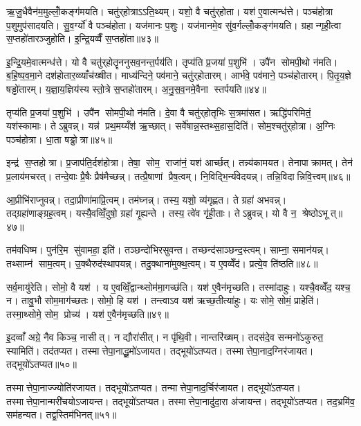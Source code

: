 ऋ॒जु॒धैवैन॑म॒मुल्लोँ॒कङ्ग॑मयति। चतु॑र्‌होत्राऽऽति॒थ्यम्। यशो॒ वै चतु॑र्‌होता। यश॑ ए॒वात्मन्ध॑त्ते। पञ्च॑होत्रा प॒शुमुप॑सादयति। सु॒व॒र्ग्यो॑ वै पञ्च॑होता। यज॑मानः प॒शुः। यज॑मानमे॒व सु॑व॒र्गल्लोँ॒कङ्ग॑मयति। ग्रहान्गृही॒त्वा स॒प्तहो॑तारञ्जुहोति। इ॒न्द्रि॒यव्वैँ स॒प्तहो॑ता॥४३॥

इ॒न्द्रि॒यमे॒वात्मन्ध॑त्ते। यो वै चतु॑र्‌होतॄननुसव॒नन्त॒र्पय॑ति। तृप्य॑ति प्र॒जया॑ प॒शुभि॑। उपै॑न सोमपी॒थो न॑मति। ब॒हि॒ष्प॒व॒मा॒ने दश॑होतार॒व्व्याँच॑ख्षीत। माध्य॑न्दिने॒ पव॑माने॒ चतु॑र्‌होतारम्। आर्भ॑वे॒ पव॑माने॒ पञ्च॑होतारम्। पि॒तृ॒य॒ज्ञे षड्ढो॑तारम्। य॒ज्ञा॒य॒ज्ञिय॑स्य स्तो॒त्रे स॒प्तहो॑तारम्। अ॒नु॒स॒व॒नमे॒वैना स्तर्पयति॥४४॥

तृप्य॑ति प्र॒जया॑ प॒शुभि॑। उपै॑न सोमपी॒थो न॑मति। दे॒वा वै चतु॑र्‌होतृभिः स॒त्रमा॑सत। ऋद्धि॑परिमितं॒ यश॑स्कामाः। तेऽब्रुवन्न्। यन्न॑ प्रथ॒मय्यँश॑ ऋ॒च्छात्। सर्वे॑षान्न॒स्तथ्स॒हास॒दिति॑। सोम॒श्चतु॑र्‌होत्रा। अ॒ग्निः पञ्च॑होत्रा। धा॒ता षड्ढोत्रा॥४५॥

इन्द्र॑ स॒प्तहोत्रा। प्र॒जाप॑ति॒र्दश॑होत्रा। तेषा॒ सोम॒ राजा॑नं॒ यश॑ आर्च्छत्। तन्न्य॑कामयत। तेनापाक्रामत्। तेन॑ प्र॒लाय॑मचरत्। तन्दे॒वाः प्रै॒षैः प्रैष॑मैच्छन्न्। तत्प्रै॒षाणां प्रैष॒त्वम्। नि॒विद्भि॒र्न्य॑वेदयन्न्। तन्नि॒विदान्निवि॒त्त्वम्॥४६॥

आ॒प्रीभि॑राप्नुवन्न्। तदा॒प्रीणा॑माप्रि॒त्वम्। तम॑घ्नन्न्। तस्य॒ यशो॒ व्य॑गृह्णत। ते ग्रहा॑ अभवन्न्। तद्ग्रहा॑णाङ्ग्रह॒त्वम्। यस्यै॒वव्विँ॒दुषो॒ ग्रहा॑ गृ॒ह्यन्ते। तस्य॒ त्वे॑व गृ॑ही॒ताः। तेऽब्रुवन्न्। यो वै न॒ श्रेष्ठोऽभूत्॥४७॥

तम॑वधिष्म। पुन॑रि॒म सु॑वामहा॒ इति॑। तञ्छन्दो॑भिरसुवन्त। तच्छन्द॑साञ्छन्द॒स्त्वम्। साम्ना॒ समान॑यन्न्। तथ्साम्न॑ साम॒त्वम्। उ॒क्थैरुद॑स्थापयन्न्। तदु॒क्थाना॑मुक्थ॒त्वम्। य ए॒वव्वेँद॑। प्रत्ये॒व ति॑ष्ठति॥४८॥

सर्व॒मायु॑रेति। सोमो॒ वै यश॑। य ए॒वव्विँ॒द्वान्थ्सोम॑मा॒गच्छ॑ति। यश॑ ए॒वैन॑मृच्छति। तस्मा॑दाहुः। यश्चै॒वव्वेँद॒ यश्च॒ न। तावु॒भौ सोम॒माग॑च्छतः। सोमो॒ हि यश॑। तन्त्वाऽव यश॑ ऋच्छ॒तीत्या॑हुः। यः सोमे॒ सोमं॒ प्राहेति॑। तस्मा॒थ्सोमे॒ सोम॒ प्रोच्य॑। यश॑ ए॒वैन॑मृच्छति॥४९॥

इ॒दव्वाँ अग्रे॒ नैव किञ्च॒ नासीत्। न द्यौरा॑सीत्। न पृ॑थि॒वी। नान्तरि॑ख्षम्। तदस॑दे॒व सन्मनो॑ऽकुरुत॒ स्यामिति॑। तद॑तप्यत। तस्मात्तेपा॒नाद्धू॒मो॑ऽजायत। तद्भूयो॑ऽतप्यत। तस्मात्तेपा॒नाद॒ग्निर॑जायत। तद्भूयो॑ऽतप्यत॥५०॥

तस्मात्तेपा॒नाज्ज्योति॑रजायत। तद्भूयो॑ऽतप्यत। तन्मात्तेपा॒नाद॒र्चिर॑जायत। तद्भूयो॑ऽतप्यत। तस्मात्तेपा॒नान्मरी॑चयोऽजायन्त। तद्भूयो॑ऽतप्यत। तस्मात्तेपा॒नादु॑दा॒रा अ॑जायन्त। तद्भूयो॑ऽतप्यत। तद॒भ्रमि॑व॒ सम॑हन्यत। तद्व॒स्तिम॑भिनत्॥५१॥

